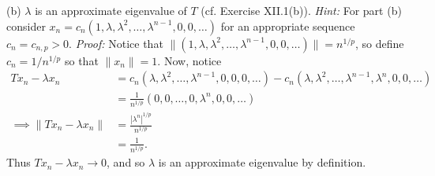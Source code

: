 \documentclass{article}
\begin{document}
\begin{itemize}
    
    (b) $\lambda$ is an approximate eigenvalue of $T$ (cf. Exercise XII.1(b)).
    \newline
    \textit{Hint:} For part (b) consider $x_n = c_n(1, \lambda, \lambda^2, \dots, \lambda^{n-1}, 0, 0, \dots)$ for an appropriate sequence $c_n = c_{n,p} > 0.$
    \newline\newline
    \textit{Proof:} Notice that $\|(1, \lambda, \lambda^2, \dots, \lambda^{n-1}, 0, 0, \dots)\| = n^{1/p}$, so define $c_n = 1/n^{1/p}$ so that $\|x_n\| = 1$. Now, notice
    \begin{align*}
        Tx_n - \lambda x_n &= c_n(\lambda, \lambda^2, \dots, \lambda^{n-1}, 0, 0, 0,\dots) - c_n(\lambda, \lambda^2, \dots, \lambda^{n-1}, \lambda^n, 0, 0, \dots)\\
        &= \frac{1}{n^{1/p}}(0,0,\dots, 0,\lambda^n,0,0,\dots)\\
        \implies \|Tx_n - \lambda x_n\| &= \frac{|\lambda^n|^{1/p}}{n^{1/p}}\\
        &= \frac{1}{n^{1/p}}.
    \end{align*}
    Thus $Tx_n - \lambda x_n \to 0$, and so $\lambda$ is an approximate eigenvalue by definition.


\end{itemize}
\end{document}
